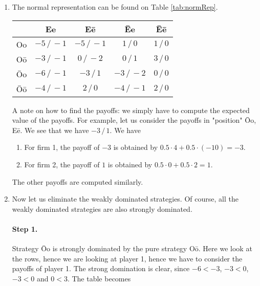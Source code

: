 \begin{enumerate}[label=\alph*.]
	\item The normal representation can be found on Table \ref{tab:normRep}.


	      	\begin{tabular}[h!]{c|cccc}
	      		       & Ee             & E\=e           & \=Ee           & \=E\=e       \\ \hline
	      		Oo     & $-5\, / \, -1$ & $-5\, / \, -1$ & $1\, / \, 0$   & $1\, / \, 0$ \\
	      		O\=o   & $-3\, / \, -1$ & $0\, / \, -2$  & $0\, / \, 1$   & $3\, / \, 0$ \\
	      		\=Oo   & $-6\, / \, -1$ & $-3\, / \, 1$  & $-3\, / \, -2$ & $0\, / \, 0$ \\
	      		\=O\=o & $-4\, / \, -1$ & $2\, / \, 0$   & $-4\, / \, -1$ & $2\, / \, 0$
	      	\end{tabular}
	      	\label{tab:normRep}


	      A note on how to find the payoffs: we simply have to compute the expected value of the payoffs. For example, let us consider the payoffs in "position" \=Oo, E\=e. We see that we have $-3\, / \, 1$. We have
	      \begin{enumerate}
	      	\item For firm 1, the payoff of $-3$ is obtained by $0.5 \cdot 4 + 0.5 \cdot (- 10) = -3$.
	      	\item For firm 2, the payoff of $1$ is obtained by $0.5 \cdot 0 + 0.5 \cdot 2 = 1$.
	      \end{enumerate}

	      The other payoffs are computed similarly.

	\item Now let us eliminate the weakly dominated strategies. Of course, all the weakly dominated strategies are also strongly dominated.

	      \paragraph{Step 1.} Strategy \=Oo is strongly dominated by the pure strategy O\=o. Here we look at the rows, hence we are looking at player 1, hence we have to consider the payoffs of player 1. The strong domination is clear, since $-6 < -3$, $-3 < 0$, $-3 < 0$ and $0 < 3$.
	      The table becomes


\end{enumerate}
